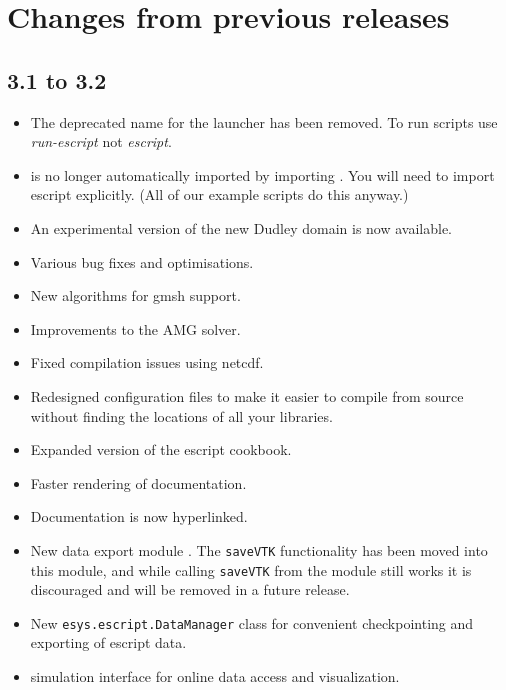 
%
%
%

\section{Changes from previous releases}
\label{app:changes}

\subsection*{3.1 to 3.2}
\begin{itemize}
\item The deprecated name for the launcher has been removed. To run scripts use
    \emph{run-escript} not \emph{escript}.
\item \escript is no longer automatically imported by importing \finley.
    You will need to import escript explicitly. (All of our example scripts do this anyway.)
\item An experimental version of the new Dudley domain is now available.
\item Various bug fixes and optimisations.
\item New algorithms for gmsh support.
\item Improvements to the AMG solver.
\item Fixed compilation issues using netcdf.
\item Redesigned configuration files to make it easier to compile from source
    without finding the locations of all your libraries.
\item Expanded version of the escript cookbook.
\item Faster rendering of documentation.
\item Documentation is now hyperlinked.
\item New data export module \weipa. The \texttt{saveVTK} functionality has
    been moved into this module, and while calling \texttt{saveVTK} from the
    \escript module still works it is discouraged and will be removed in a
    future release.
\item New \texttt{esys.escript.DataManager} class for convenient checkpointing
    and exporting of escript data.
\item \VisIt simulation interface for online data access and visualization.
\end{itemize}

